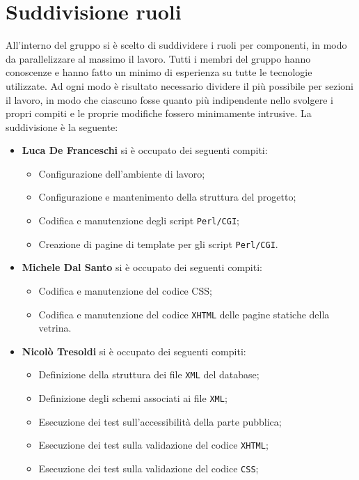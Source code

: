 \section{Suddivisione ruoli}

All'interno del gruppo si è scelto di suddividere i ruoli per componenti, in modo da parallelizzare al massimo il lavoro. Tutti i membri del gruppo hanno conoscenze e hanno fatto un minimo di esperienza su tutte le tecnologie utilizzate. Ad ogni modo è risultato necessario dividere il più possibile per sezioni il lavoro, in modo che ciascuno fosse quanto più indipendente nello svolgere i propri compiti e le proprie modifiche fossero minimamente intrusive. La suddivisione è la seguente:

\begin{itemize}
	\item \textbf{Luca De Franceschi} si è occupato dei seguenti compiti:
	\begin{itemize}
		\item Configurazione dell'ambiente di lavoro;
		\item Configurazione e mantenimento della struttura del progetto;
		\item Codifica e manutenzione degli script \texttt{Perl/CGI};
		\item Creazione di pagine di template per gli script \texttt{Perl/CGI}.
	\end{itemize}
	\item \textbf{Michele Dal Santo} si è occupato dei seguenti compiti:
	\begin{itemize}
		\item Codifica e manutenzione del codice CSS;
		\item Codifica e manutenzione del codice \texttt{XHTML} delle pagine statiche della vetrina.
	\end{itemize}
	\item \textbf{Nicolò Tresoldi} si è occupato dei seguenti compiti:
	\begin{itemize}
		\item Definizione della struttura dei file \texttt{XML} del database;
		\item Definizione degli schemi associati ai file \texttt{XML};
		\item Esecuzione dei test sull'accessibilità della parte pubblica;
		\item Esecuzione dei test sulla validazione del codice \texttt{XHTML};
		\item Esecuzione dei test sulla validazione del codice \texttt{CSS};

\end{itemize}
\end{itemize}

